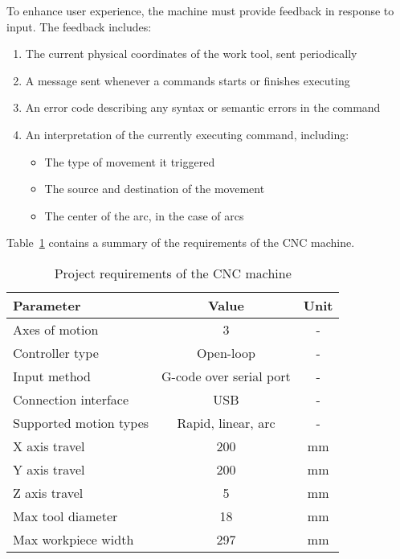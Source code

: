 To enhance user experience, the machine must provide feedback in response to
input. The feedback includes:
\begin{enumerate}
    \item The current physical coordinates of the work tool, sent periodically
    \item A message sent whenever a commands starts or finishes executing
    \item An error code describing any syntax or semantic errors in the command
    \item An interpretation of the currently executing command, including:
        \begin{itemize}
            \item The type of movement it triggered
            \item The source and destination of the movement
            \item The center of the arc, in the case of arcs
        \end{itemize}
\end{enumerate}

Table~\ref{projectRequirements} contains a summary of the requirements
of the CNC machine.

\begin{table}[ht]
    \begin{center}
        \begin{tabular}{ |l|c|c| }
            \hline
            Parameter & Value & Unit \\
            \hline
            Axes of motion & 3 & - \\
            Controller type & Open-loop & - \\
            Input method & G-code over serial port & - \\
            Connection interface & USB & - \\
            Supported motion types & Rapid, linear, arc & - \\
            X axis travel & 200 & mm \\
            Y axis travel & 200 & mm \\
            Z axis travel & 5 & mm \\
            Max tool diameter & 18 & mm \\
            Max workpiece width & 297 & mm \\
            \hline
        \end{tabular}
        \caption{Project requirements of the CNC machine}
        \label{projectRequirements}
    \end{center}
\end{table}

